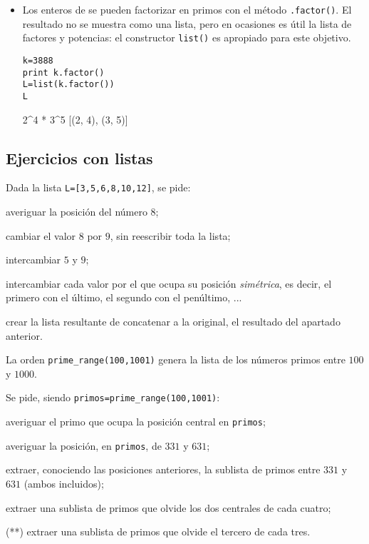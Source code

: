 \begin{itemize}
\item Los enteros de {\sage} se pueden factorizar en primos con el método
\lstinline|.factor()|. El resultado no se muestra como una lista, pero en
ocasiones es
útil la lista de factores y potencias: el constructor \lstinline|list()| es
apropiado
para este objetivo.
\begin{lstlisting}
k=3888
print k.factor()
L=list(k.factor())
L
\end{lstlisting}
\begin{Output}
	2^4 * 3^5
	[(2, 4), (3, 5)]
\end{Output}
\end{itemize}



\subsection{Ejercicios con listas}
\label{ejer-0}
\begin{ejer}
Dada la lista \lstinline|L=[3,5,6,8,10,12]|, se pide:

 averiguar la posición del número $8$;

 cambiar el valor $8$ por $9$, sin reescribir toda la lista;

 intercambiar $5$ y $9$;

 intercambiar cada valor por el que ocupa su posición \emph{simétrica}, es
decir,
el primero con el último, el segundo con el penúltimo, ...

 crear la lista resultante de concatenar a la original, el resultado del
apartado
anterior.

\end{ejer}

\begin{ejer}
La orden \lstinline|prime_range(100,1001)| genera la lista de los números primos
entre
$100$ y $1000$. 

Se pide, siendo \verb|primos|\lstinline|=prime_range(100,1001)|:

 averiguar el primo que ocupa la posición central en \verb|primos|;

 averiguar la posición, en \verb|primos|, de $331$ y $631$;

 extraer, conociendo las posiciones anteriores, la sublista de primos
entre $331$ y
$631$ (ambos incluidos);

 extraer una sublista de primos que olvide los dos centrales de cada
cuatro;

 (**) extraer una sublista de primos que olvide el tercero de cada tres.
\end{ejer}


